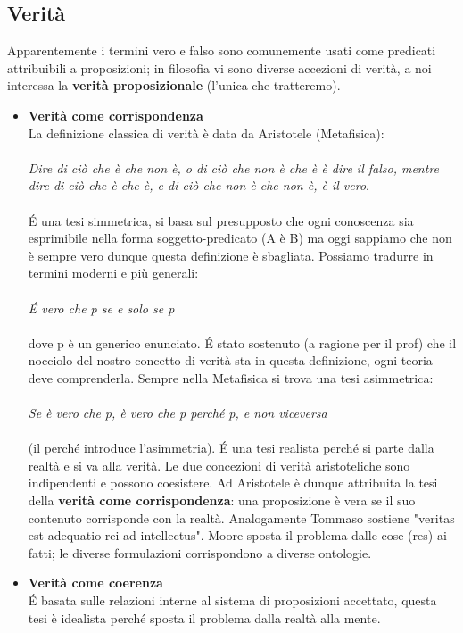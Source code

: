 \documentclass[10pt,a4paper]{article}
\begin{document}
\subsection{Verità}
	Apparentemente i termini vero e falso sono comunemente usati come predicati attribuibili a proposizioni; in filosofia vi sono diverse accezioni di verità, a noi interessa la \textbf{verità proposizionale} (l'unica che tratteremo).
\begin{itemize}
	\item \textbf{Verità come corrispondenza}\\
 	La definizione classica di verità è data da Aristotele (Metafisica):\\\\
 	\textit{Dire di ciò che è che non è, o di ciò che non è che è è dire il falso, mentre dire di ciò che è che è, e di ciò che non è che non è, è il vero}.\\\\
 	\'E una tesi simmetrica, si basa sul presupposto che ogni conoscenza sia esprimibile nella forma soggetto-predicato (A è B) ma oggi sappiamo che non è sempre vero dunque questa definizione è sbagliata. Possiamo tradurre in termini moderni e più generali:\\\\
 	\textit{\'E vero che p se e solo se p}\\\\
 	dove p è un generico enunciato. \'E stato sostenuto (a ragione per il prof) che il nocciolo del nostro concetto di verità sta in questa definizione, ogni teoria deve comprenderla. Sempre nella Metafisica si trova una tesi asimmetrica:\\\\
 	\textit{Se è vero che p, è vero che p perché p, e non viceversa}\\\\
 	(il perché introduce l'asimmetria). \'E una tesi realista perché si parte dalla realtà e si va alla verità. Le due concezioni di verità aristoteliche sono indipendenti e possono coesistere.
	Ad Aristotele è dunque attribuita la tesi della \textbf{verità come corrispondenza}: una proposizione è vera se il suo contenuto corrisponde con la realtà. Analogamente Tommaso sostiene "veritas est adequatio rei ad intellectus". Moore sposta il problema dalle cose (res) ai fatti; le diverse formulazioni corrispondono a diverse ontologie.
	\item \textbf{Verità come coerenza}\\
	\'E basata sulle relazioni interne al sistema di proposizioni accettato, questa tesi è idealista perché sposta il problema dalla realtà alla mente.

\end{itemize}
\end{document}
